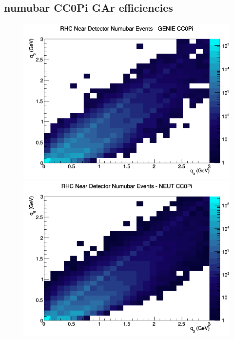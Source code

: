 \subsection{numubar CC0Pi GAr efficiencies}
\begin{figure}[h]
\includegraphics[width=\linewidth]{eff_q0_q3/GAr/CC0Pi_RHC_ND_numubar_q3_q0_GENIE.png}
\endminipage
{}
\includegraphics[width=\linewidth]{eff_q0_q3/GAr/CC0Pi_RHC_ND_numubar_q3_q0_NEUT.png}
\endminipage
{}

\end{figure}
